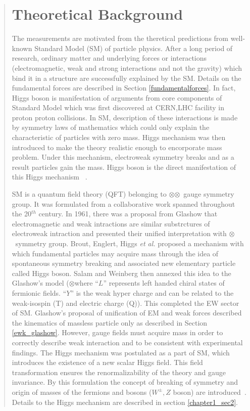\begin{abstract}
	\section{Theoretical Background} \label{chinese_abstract_theor_bkg}  
	The measurements are motivated from the theretical predictions from well-known Standard Model (SM) of particle physics. After a long period of research, ordinary matter and underlying forces or interactions (electromagnetic, weak and strong interactions and not the gravity) which bind it in a structure are successfully explained by the SM. Details on the fundamental forces are described in Section \ref{fundamentalforces}. In fact, Higgs boson is manifestation of arguments from core components of Standard Model which was first discovered at CERN,LHC facility in proton proton collisions. 
In SM, description of these interactions is made by symmetry laws of mathematics which could only explain the characteristic of particles with zero mass.
Higgs mechanism was then introduced to make the theory realistic enough to encorporate mass problem. Under this mechanism, electroweak symmetry breaks and as a result particles gain the mass. Higgs boson is the direct manifestation of this Higgs mechanism ~\cite{Reference7,Reference8,Reference9,Reference10,Reference11,Reference12}.
	\par SM is a quantum field theory (QFT) belonging to \suthreec$\otimes$\sutwol$\otimes$\uoneg~gauge symmetry group. It was formulated from a collaborative work spanned throughout the 20$^{th}$ century. In 1961, there was a proposal from Glashow that electromagnetic and weak intractions are similar substrctures of electroweak intraction and presented their unified interpretation with \sutwol$\otimes$\uoneg ~symmetry group.  Brout, Englert, Higgs \textit{et al.} proposed a mechanism with which fundamental particles may acquire mass through the idea of spontaneous symmetry breaking and associated new elementary particle called Higgs boson. Salam and Weinberg then annexed this idea to the Glashow's model (\sutwol$\otimes$\uoneg where ``$L$'' represents left handed chiral states of fermionic fields.  ``$Y$'' is the weak hyper charge and can be related to the weak-isospin (T) and electric charge (Q)). This completed the EW sector of SM. Glashow's proposal of unification of EM and weak forces described the kinematics of massless particle only as described in Section \ref{ewk_glashow}.
However, gauge fields must acquire mass in order to correctly describe weak interaction and to be consistent with experimental findings. The Higgs mechanism was postulated as a part of SM, which introduces the
existence of a new scalar Higgs field. This field transformation ensures the renormalizability of the theory and gauge invariance.
By this formulation
the concept of breaking of symmetry and origin of masses of the fermions and bosons ($W^{\pm}, Z$ boson) are introduced~\cite{Reference7,Reference8,Reference9,Reference10,Reference11,Reference12}. Details to the Higgs mechanism are described in section \ref{chapter1_sec2}.

\end{abstract}
